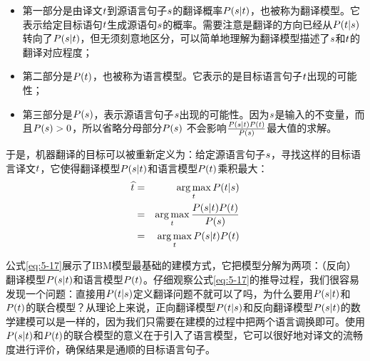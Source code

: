 \begin{itemize}
\vspace{0.5em}
\item 第一部分是由译文${t}$到源语言句子${s}$的翻译概率${P}({s}|{t})$，也被称为翻译模型。它表示给定目标语句${t}$生成源语句${s}$的概率。需要注意是翻译的方向已经从${P}({t}|{s})$转向了${P}({s}|{t})$，但无须刻意地区分，可以简单地理解为翻译模型描述了${s}$和${t}$的翻译对应程度；
\vspace{0.5em}
\item 第二部分是${P}({t})$，也被称为语言模型。它表示的是目标语言句子${t}$出现的可能性；
\vspace{0.5em}
\item 第三部分是${P}({s})$，表示源语言句子${s}$出现的可能性。因为${s}$是输入的不变量，而且${P}({s}) > 0$，所以省略分母部分${P}({s})$ 不会影响$\frac{{P}({s}|{t}){P}({t})}{{P}({s})}$最大值的求解。
\vspace{0.5em}
\end{itemize}

于是，机器翻译的目标可以被重新定义为：给定源语言句子${s}$，寻找这样的目标语言译文${t}$，它使得翻译模型${P}({s}|{t})$和语言模型${P}({t})$乘积最大：
\begin{eqnarray}
\widehat{{t}} & = & \operatorname*{arg\,max}_{{t}} {P}({t}|{s}) \nonumber \\
          & = & \operatorname*{arg\,max}_{{t}} \frac{{P}({s}|{t}){P}({t})}{{P}({s})} \nonumber \\
          & = & \operatorname*{arg\,max}_{{t}} {P}({s}|{t}){P}({t})
\label{eq:5-17}
\end{eqnarray}

\parinterval 公式\eqref{eq:5-17}展示了IBM模型最基础的建模方式，它把模型分解为两项：（反向）翻译模型${P}({s}|{t})$和语言模型${P}({t})$。仔细观察公式\eqref{eq:5-17}的推导过程，我们很容易发现一个问题：直接用${P}({t}|{s})$定义翻译问题不就可以了吗，为什么要用${P}({s}|{t})$和${P}({t})$的联合模型？从理论上来说，正向翻译模型${P}({t}|{s})$和反向翻译模型${P}({s}|{t})$的数学建模可以是一样的，因为我们只需要在建模的过程中把两个语言调换即可。使用${P}({s}|{t})$和${P}({t})$的联合模型的意义在于引入了语言模型，它可以很好地对译文的流畅度进行评价，确保结果是通顺的目标语言句子。

